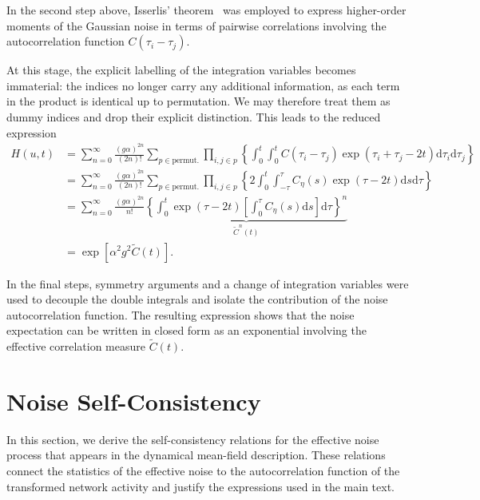 \documentclass[reprint,amsmath,amssymb,aps]{revtex4-2}
\begin{document}
In the second step above, Isserlis’ theorem~\cite{isserlis1918} was employed to express higher-order moments of the Gaussian noise in terms of pairwise correlations involving the autocorrelation function $C(\tau_i-\tau_j)$.  

At this stage, the explicit labelling of the integration variables becomes immaterial: the indices no longer carry any additional information, as each term in the product is identical up to permutation. We may therefore treat them as dummy indices and drop their explicit distinction. This leads to the reduced expression
\begin{align*}
    H(u, t)
    & =
    \sum_{n=0}^\infty
    \frac{\left(g \alpha\right)^{2n}}{(2n)!} 
    \sum_{p\in\text{permut.}}
    \prod_{i,j\in p}
    \left\{
    \int_0^t
    \int_0^t
    C(\tau_i-\tau_j)
    \exp\left(
    \tau_i + \tau_j - 2t\right)
    \mathrm{d}\tau_i
    \mathrm{d}\tau_j
    \right\} \\
    & =
    \sum_{n=0}^\infty
    \frac{\left(g \alpha\right)^{2n}}{(2n)!} 
    \sum_{p\in\text{permut.}}
    \prod_{i,j\in p}
    \left\{
    2
    \int_0^t
    \int_{-\tau}^{\tau}
    C_{\eta}(s)
    \exp\left(
    \tau - 2t\right)
    \mathrm{d}s
    \mathrm{d}\tau
    \right\} \\
     & =
    \sum_{n=0}^\infty
    \frac{\left(g \alpha\right)^{2n}}{n!} 
    \underbrace{
    \left\{
    \int_0^t
    \exp\left(
    \tau - 2t\right)
    \left[
    \int_0^{\tau}
    C_{\eta}(s)
    \mathrm{d}s
    \right]
    \mathrm{d}\tau
    \right\}^n
    }_{
    \tilde{C}^n(t)
    } \\
    & =
    \exp\left[\alpha^2 g^2 \tilde{C}(t)\right].
\end{align*}

In the final steps, symmetry arguments and a change of integration variables were used to decouple the double integrals and isolate the contribution of the noise autocorrelation function. The resulting expression shows that the noise expectation can be written in closed form as an exponential involving the effective correlation measure $\tilde{C}(t)$.

\section{Noise Self-Consistency}
\label{app:self_consistency}

In this section, we derive the self-consistency relations for the effective noise process that appears in the dynamical mean-field description. These relations connect the statistics of the effective noise to the autocorrelation function of the transformed network activity and justify the expressions used in the main text.
\end{document}
